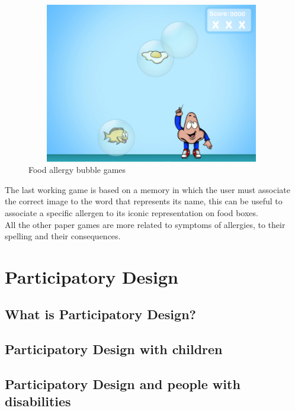 \begin{figure}[H]
\centering
\includegraphics[width=11cm, height=7cm]{immagini/bubble.png}
\caption{Food allergy bubble games}\label{fig:bubble}
\end{figure}
The last working game is based on a memory in which the user must associate the correct image to the word that represents its name, this can be useful to associate a specific allergen to its iconic representation on food boxes.\\
All the other paper games are more related to symptoms of allergies, to their spelling and their consequences.

\section{Participatory Design}
\subsection{What is Participatory Design?}
\subsection{Participatory Design with children}
\subsection{Participatory Design and people with disabilities}

